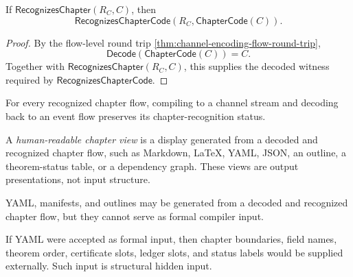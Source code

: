 \begin{theorem}
\label{thm:chapter-generated-compile-decode-preserves-recognition}
If $\mathsf{RecognizesChapter}(R_C,C)$, then
$$
  \mathsf{RecognizesChapterCode}(R_C,\mathsf{ChapterCode}(C)).
$$
\end{theorem}

\begin{proof}
By the flow-level round trip \autoref{thm:channel-encoding-flow-round-trip},
$$
  \mathsf{Decode}(\mathsf{ChapterCode}(C))=C.
$$
Together with $\mathsf{RecognizesChapter}(R_C,C)$, this supplies the decoded witness required by $\mathsf{RecognizesChapterCode}$.
\end{proof}

\begin{corollary}
\label{cor:chapter-generated-recognition-invariant}
For every recognized chapter flow, compiling to a channel stream and decoding back to an event flow preserves its chapter-recognition status.
\end{corollary}

\begin{definition}
\label{def:chapter-generated-human-readable-view}
A \emph{human-readable chapter view} is a display generated from a decoded and recognized chapter flow, such as Markdown, \LaTeX{}, YAML, JSON, an outline, a theorem-status table, or a dependency graph. These views are output presentations, not input structure.
\end{definition}

\begin{principle}
\label{prin:chapter-generated-yaml-output-not-input}
YAML, manifests, and outlines may be generated from a decoded and recognized chapter flow, but they cannot serve as formal compiler input.
\end{principle}

\begin{proposition}
\label{prop:chapter-generated-yaml-hidden-structure}
If YAML were accepted as formal input, then chapter boundaries, field names, theorem order, certificate slots, ledger slots, and status labels would be supplied externally. Such input is structural hidden input.
\end{proposition}

